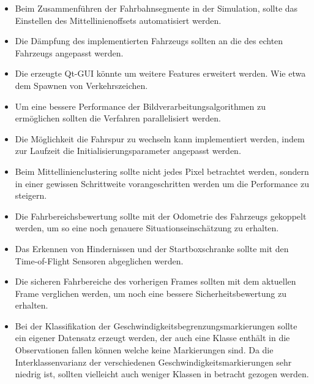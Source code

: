 \begin{itemize}
\item Beim Zusammenf\"uhren der Fahrbahnsegmente in der Simulation, sollte das Einstellen des Mittellinienoffsets automatisiert werden.

\item Die D\"ampfung des implementierten Fahrzeugs sollten an die des echten Fahrzeugs angepasst werden.

\item Die erzeugte Qt-GUI k\"onnte um weitere Features erweitert werden. Wie etwa dem Spawnen von Verkehrszeichen. 

\item Um eine bessere Performance der Bildverarbeitungsalgorithmen zu erm\"oglichen sollten die Verfahren parallelisiert werden.

\item Die M\"oglichkeit die Fahrspur zu wechseln kann implementiert werden, indem zur Laufzeit die Initialisierungsparameter angepasst werden.

\item Beim Mittellinienclustering sollte nicht jedes Pixel betrachtet werden, sondern in einer gewissen Schrittweite vorangeschritten werden um die Performance zu steigern.

\item Die Fahrbereichsbewertung sollte mit der Odometrie des Fahrzeugs gekoppelt werden, um so eine noch genauere Situationseinsch\"atzung zu erhalten.

\item Das Erkennen von Hindernissen und der Startboxschranke sollte mit den Time-of-Flight Sensoren abgeglichen werden.

\item Die sicheren Fahrbereiche des vorherigen Frames sollten mit dem aktuellen Frame verglichen werden, um noch eine bessere Sicherheitsbewertung zu erhalten.

\item Bei der Klassifikation der Geschwindigkeitsbegrenzungsmarkierungen sollte ein eigener Datensatz erzeugt werden, der auch eine Klasse enth\"alt in die Observationen fallen k\"onnen welche keine Markierungen sind. Da die Interklassenvarianz der verschiedenen Geschwindigkeitsmarkierungen sehr niedrig ist, sollten vielleicht auch weniger Klassen in betracht gezogen werden.

\end{itemize}



